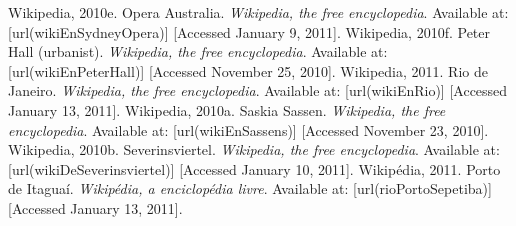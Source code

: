 {%
Wikipedia, 2010e. Opera Australia. {\em Wikipedia, the free encyclopedia}. Available at:  [url(wikiEnSydneyOpera)] [Accessed January 9, 2011]. \nl%
%
Wikipedia, 2010f. Peter Hall (urbanist). {\em Wikipedia, the free encyclopedia}. Available at:  [url(wikiEnPeterHall)] [Accessed November 25, 2010]. \nl%
%
Wikipedia, 2011. Rio de Janeiro. {\em Wikipedia, the free encyclopedia}. Available at:  [url(wikiEnRio)] [Accessed January 13, 2011]. \nl%
%
Wikipedia, 2010a. Saskia Sassen. {\em Wikipedia, the free encyclopedia}. Available at:  [url(wikiEnSassens)] [Accessed November 23, 2010]. \nl%
%
Wikipedia, 2010b. Severinsviertel. {\em Wikipedia, the free encyclopedia}. Available at:  [url(wikiDeSeverinsviertel)] [Accessed January 10, 2011]. \nl%
%
Wikipédia, 2011. Porto de Itaguaí. {\em Wikipédia, a enciclopédia livre}. Available at:  [url(rioPortoSepetiba)] [Accessed January 13, 2011]. \nl%
%
\stopREF%
}


